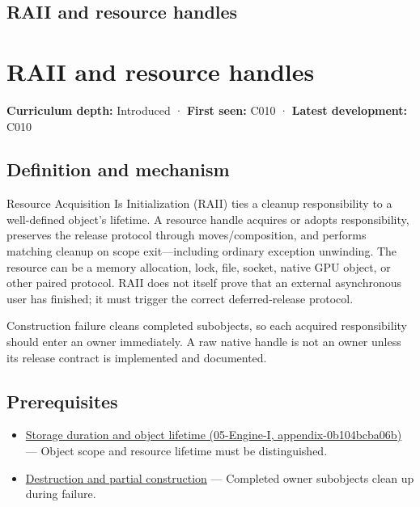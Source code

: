 \hypertarget{appendix-69739d3ab49b}{}
\section*{RAII and resource handles}
\chapter{RAII and resource handles}\label{appendix-69739d3ab49b-raii-and-resource-handles}

\textbf{Curriculum depth:} Introduced · \textbf{First seen:} C010 · \textbf{Latest development:} C010

\section{Definition and mechanism}\label{appendix-69739d3ab49b-definition-and-mechanism}

Resource Acquisition Is Initialization (RAII) ties a cleanup responsibility to a well-defined object's lifetime. A resource handle acquires or adopts responsibility, preserves the release protocol through moves/composition, and performs matching cleanup on scope exit---including ordinary exception unwinding. The resource can be a memory allocation, lock, file, socket, native GPU object, or other paired protocol. RAII does not itself prove that an external asynchronous user has finished; it must trigger the correct deferred-release protocol.

Construction failure cleans completed subobjects, so each acquired responsibility should enter an owner immediately. A raw native handle is not an owner unless its release contract is implemented and documented.

\section{Prerequisites}\label{appendix-69739d3ab49b-prerequisites}

\begin{itemize}
\tightlist
\item
  \href{../05-Engine-I/main.pdf\#nameddest=appendix-0b104bcba06b}{Storage duration and object lifetime (05-Engine-I, appendix-0b104bcba06b)} --- Object scope and resource lifetime must be distinguished.
\item
  \hyperref[appendix-9bfe377cef7a]{Destruction and partial construction} --- Completed owner subobjects clean up during failure.
\end{itemize}

